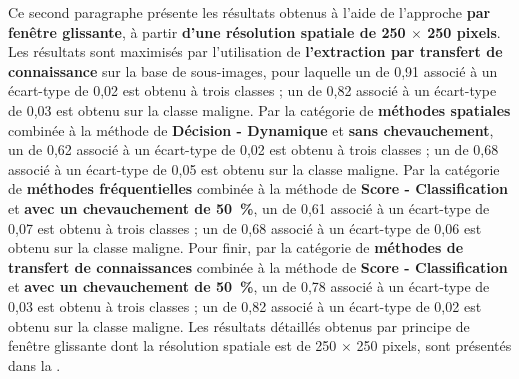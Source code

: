Ce second paragraphe présente les résultats obtenus à l'aide de l'approche \textbf{par fenêtre glissante}, à partir \textbf{d'une résolution spatiale de 250 $\times$ 250 pixels}. Les résultats sont maximisés par l'utilisation de \textbf{l'extraction par transfert de connaissance} sur la base de sous-images, pour laquelle un \fscore{} de 0,91 associé à un écart-type de 0,02 est obtenu à trois classes ; un \fscore{} de 0,82 associé à un écart-type de 0,03 est obtenu sur la classe maligne. Par la catégorie de \textbf{méthodes spatiales} combinée à la méthode de \textbf{Décision - Dynamique} et \textbf{sans chevauchement}, un \fscore{} de 0,62 associé à un écart-type de 0,02 est obtenu à trois classes ; un \fscore{} de 0,68 associé à un écart-type de 0,05 est obtenu sur la classe maligne. Par la catégorie de \textbf{méthodes fréquentielles} combinée à la méthode de \textbf{Score - Classification} et \textbf{avec un chevauchement de 50~\%}, un \fscore{} de 0,61 associé à un écart-type de 0,07 est obtenu à trois classes ; un \fscore{} de 0,68 associé à un écart-type de 0,06 est obtenu sur la classe maligne. Pour finir, par la catégorie de \textbf{méthodes de transfert de connaissances} combinée à la méthode de \textbf{Score - Classification} et \textbf{avec un chevauchement de 50~\%}, un \fscore{} de 0,78 associé à un écart-type de 0,03 est obtenu à trois classes ; un \fscore{} de 0,82 associé à un écart-type de 0,02 est obtenu sur la classe maligne. Les résultats détaillés obtenus par principe de fenêtre glissante dont la résolution spatiale est de 250 $\times$ 250 pixels, sont présentés dans la .\par

